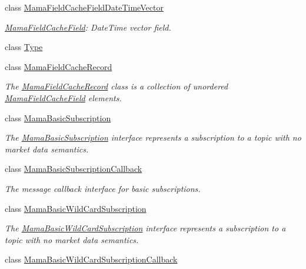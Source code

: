 \begin{DoxyCompactItemize}
class \hyperlink{classWombat_1_1MamaFieldCacheFieldDateTimeVector}{MamaFieldCacheFieldDateTimeVector}
\begin{DoxyCompactList}\small\item\em \hyperlink{classWombat_1_1MamaFieldCacheField}{MamaFieldCacheField}: DateTime vector field. \item\end{DoxyCompactList}\item 
class \hyperlink{classWombat_1_1Type}{Type}
\item 
class \hyperlink{classWombat_1_1MamaFieldCacheRecord}{MamaFieldCacheRecord}
\begin{DoxyCompactList}\small\item\em The {\ttfamily \hyperlink{classWombat_1_1MamaFieldCacheRecord}{MamaFieldCacheRecord}} class is a collection of unordered {\ttfamily \hyperlink{classWombat_1_1MamaFieldCacheField}{MamaFieldCacheField}} elements. \item\end{DoxyCompactList}\item 
class \hyperlink{classWombat_1_1MamaBasicSubscription}{MamaBasicSubscription}
\begin{DoxyCompactList}\small\item\em The {\ttfamily \hyperlink{classWombat_1_1MamaBasicSubscription}{MamaBasicSubscription}} interface represents a subscription to a topic with no market data semantics. \item\end{DoxyCompactList}\item 
class \hyperlink{classWombat_1_1MamaBasicSubscriptionCallback}{MamaBasicSubscriptionCallback}
\begin{DoxyCompactList}\small\item\em The message callback interface for basic subscriptions. \item\end{DoxyCompactList}\item 
class \hyperlink{classWombat_1_1MamaBasicWildCardSubscription}{MamaBasicWildCardSubscription}
\begin{DoxyCompactList}\small\item\em The {\ttfamily \hyperlink{classWombat_1_1MamaBasicWildCardSubscription}{MamaBasicWildCardSubscription}} interface represents a subscription to a topic with no market data semantics. \item\end{DoxyCompactList}\item 
class \hyperlink{classWombat_1_1MamaBasicWildCardSubscriptionCallback}{MamaBasicWildCardSubscriptionCallback}

\end{DoxyCompactItemize}
